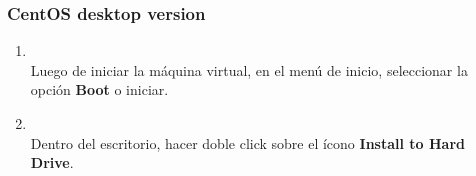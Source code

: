 \documentclass[11pt]{article}
\begin{document}
	\subsubsection{CentOS desktop version}	
		\begin{enumerate}
			\item 
				\begin{minipage}[t]{\linewidth}
			        \raggedright
			        \medskip
			        \\Luego de iniciar la máquina virtual, en el menú de inicio, seleccionar la opción \textbf{Boot} o iniciar. 
		        \end{minipage}

		    \item
		    	\begin{minipage}[t]{\linewidth}
			        \raggedright
			        \medskip
			        \\Dentro del escritorio, hacer doble click sobre el ícono \textbf{Install to Hard Drive}. 
		        \end{minipage}	


\end{enumerate}
\end{document}
